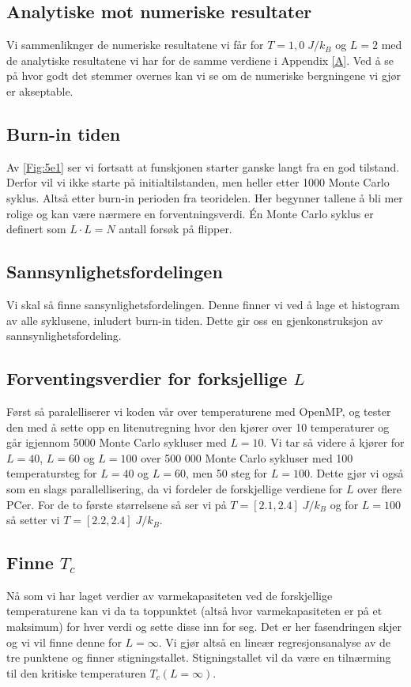 \documentclass[reprint,english,notitlepage]{revtex4-2}  %
\begin{document}
\subsection{Analytiske mot numeriske resultater}

Vi sammenliknger de numeriske resultatene vi får for $T = 1,0 \; J/k_B$ og $L =2$ med de analytiske resultatene vi har for de samme verdiene i Appendix \ref{A}. Ved å se på hvor godt det stemmer overnes kan vi se om de numeriske bergningene vi gjør er akseptable.
\subsection{Burn-in tiden}
Av \autoref{Fig:5e1} ser vi fortsatt at funskjonen starter ganske langt fra en god tilstand. Derfor vil vi ikke starte på initialtilstanden, men heller etter 1000 Monte Carlo syklus. Altså etter burn-in perioden fra teoridelen. Her begynner tallene å bli mer rolige og kan være nærmere en forventningsverdi. Én Monte Carlo syklus er definert som $L\cdot L=N$ antall forsøk på flipper.
\subsection{Sannsynlighetsfordelingen}
Vi skal så finne sansynlighetsfordelingen. Denne finner vi ved å lage et histogram av alle syklusene, inludert burn-in tiden. Dette gir oss en gjenkonstruksjon av sannsynlighetsfordeling.

\subsection{Forventingsverdier for forksjellige $L$}

Først så paralelliserer vi koden vår over temperaturene med OpenMP, og tester den med å sette opp en litenutregning hvor den kjører over 10 temperaturer og går igjennom 5000 Monte Carlo sykluser med $L = 10$. Vi tar så videre å kjører for $L = 40$, $L = 60$ og $L = 100$ over 500 000 Monte Carlo sykluser med 100 temperatursteg for $L = 40$ og $L = 60$, men 50 steg for $L = 100$. Dette gjør vi også som en slags parallellisering, da vi fordeler de forskjellige verdiene for $L$ over flere PCer. For de to første størrelsene så ser vi på $T = [2.1, 2.4] \; J/k_B$ og for $L = 100$ så setter vi $T = [2.2, 2.4] \; J/k_B$.
\subsection{Finne $T_c$}
Nå som vi har laget verdier av varmekapasiteten ved de forskjellige temperaturene kan vi da ta toppunktet (altså hvor varmekapasiteten er på et maksimum) for hver verdi og sette disse inn for seg. Det er her fasendringen skjer og vi vil finne denne for $L=\infty$. Vi gjør altså en lineær regresjonsanalyse av de tre punktene og finner stigningstallet. Stigningstallet vil da være en tilnærming til den kritiske temperaturen $T_c(L=\infty)$.
\end{document}
